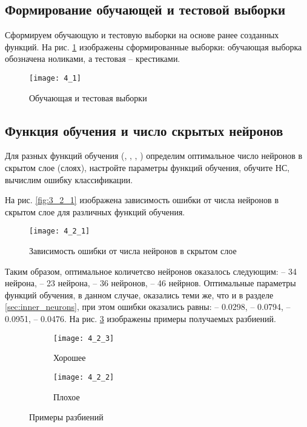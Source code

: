 \subsection{Формирование обучающей и тестовой выборки}

Сформируем обучающую и тестовую выборки на основе ранее созданных функций. На рис. \ref{fig:4_1} изображены сформированные выборки: обучающая выборка обозначена ноликами, а тестовая -- крестиками.
\begin{figure}[H]
\begin{center}
	\texttt{[image: 4\_1]}
	\caption{Обучающая и тестовая выборки}
	\label{fig:4_1}
\end{center}
\end{figure}

\subsection{Функция обучения и число скрытых нейронов}

Для разных функций обучения (, , , ) определим оптимальное число нейронов в скрытом слое (слоях), настройте параметры функций обучения, обучите НС, вычислим ошибку классификации.

На рис. \ref{fig:3_2_1} изображена зависимость ошибки от числа нейронов в скрытом слое для различных функций обучения.
\begin{figure}[H]
\begin{center}
	\texttt{[image: 4\_2\_1]}
	\caption{Зависимость ошибки от числа нейронов в скрытом слое}
	\label{fig:4_2_1}
\end{center}
\end{figure}
Таким образом, оптимальное количетсво нейронов оказалось следующим:  -- 34 нейрона,  -- 23 нейрона,  -- 36 нейронов,  -- 46 нейрнов. Оптимальные параметры функций обучения, в данном случае, оказались теми же, что и в разделе \ref{sec:inner_neurons}, при этом ошибки  оказались равны:  -- 0.0298,  -- 0.0794,  -- 0.0951,  -- 0.0476. На рис. \ref{fig:4_2} изображены примеры получаемых разбиений.
\begin{figure}[H]
\begin{center}
	\begin{subfigure}[b]{0.49\textwidth}
		\texttt{[image: 4\_2\_3]}
		\caption{Хорошее}
	\end{subfigure}
	\begin{subfigure}[b]{0.49\textwidth}
		\texttt{[image: 4\_2\_2]}
		\caption{Плохое}
	\end{subfigure}
	\caption{Примеры разбиений}
	\label{fig:4_2}
\end{center}
\end{figure}

